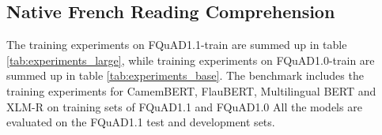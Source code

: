 \documentclass{article}
\begin{document}
\subsection{Native French Reading Comprehension}

The training experiments on FQuAD1.1-train are summed up in table \ref{tab:experiments_large}, while training experiments on FQuAD1.0-train are summed up in table \ref{tab:experiments_base}.
The benchmark includes the training experiments for CamemBERT, FlauBERT, Multilingual BERT and XLM-R on training sets of FQuAD1.1 and FQuAD1.0
All the models are evaluated on the FQuAD1.1 test and development sets.

\begin{table}[ht]
    \small
    \centering
    \renewcommand{\arraystretch}{1.3}
    \caption{Results of the experiments for various monolingual and multilingual models carried out on the training dataset of \textbf{FQuAD1.1-train} and evaluated on test and development sets of FQuAD1.1}
    \label{tab:experiments_large}
\end{table}
\end{document}
